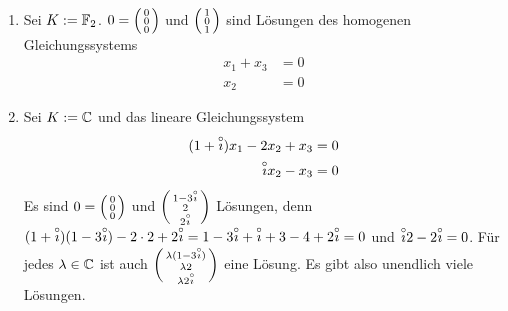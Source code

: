 \documentclass[../../main.tex]{subfiles}
\begin{document}
\begin{bsp}\label{5.1.2}
\begin{enumerate}[\normalfont(a)]
\item Sei $K:=\F_2$. $0=\cvec{0\\0\\0}$ und $\cvec{1\\0\\1}$ sind Lösungen des homogenen Gleichungssystems \begin{align*}
x_1+x_3& =0\\
x_2&=0
\end{align*}
\item Sei $K:=\C$ und das lineare Gleichungssystem
\begin{align*}
(1+\i)x_1-2x_2+x_3&=0\\
\i x_2-x_3&=0
\end{align*}
Es sind $0=\cvec{0\\0\\0}$ und $\cvec{1-3\i\\2\\2\i}$ Lösungen, denn $(1+\i)(1-3\i)-2\cdot2+2\i=1-3\i+\i+3-4+2\i=0$ und $\i2-2\i=0$. Für jedes $\lambda\in\C$ ist auch $\cvec{\lambda(1-3\i)\\\lambda2\\\lambda2\i}$ eine Lösung. Es gibt also unendlich viele Lösungen.
\end{enumerate}
\end{bsp}
\end{document}
